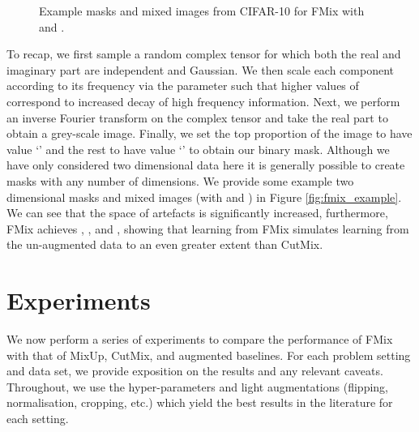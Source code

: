 \documentclass[journal]{IEEEtran}
\newcommand{\fmix}{FMix\xspace}
\newcommand{\mixup}{MixUp\xspace}
\newcommand{\cutmix}{CutMix\xspace}
\begin{document}
\begin{figure}
    \centering
    \caption{Example masks and mixed images from CIFAR-10 for \fmix with  and .}\label{fig:fmix_example}
    \label{fig:mask_visualisation}
\end{figure}

To recap, we first sample a random complex tensor for which both the real and imaginary part are independent and Gaussian. We then scale each component according to its frequency via the parameter  such that higher values of  correspond to increased decay of high frequency information. Next, we perform an inverse Fourier transform on the complex tensor and take the real part to obtain a grey-scale image. Finally, we set the top proportion of the image to have value `' and the rest to have value `' to obtain our binary mask. Although we have only considered two dimensional data here it is generally possible to create
masks with any number of dimensions.
We provide some example two dimensional masks and mixed images (with  and ) in Figure \ref{fig:fmix_example}. We can see that the space of artefacts is significantly increased, furthermore, \fmix achieves , , and , showing that learning from \fmix simulates learning from the un-augmented data to an even greater extent than \cutmix.













\section{Experiments}\label{sec:experiments}

We now perform a series of experiments to compare the performance of \fmix with that of \mixup, \cutmix, and augmented baselines. For each problem setting and data set, we provide exposition on the results and any relevant caveats. Throughout, we use the hyper-parameters and light augmentations (flipping, normalisation, cropping, etc.) which yield the best results in the literature for each setting.
\end{document}
